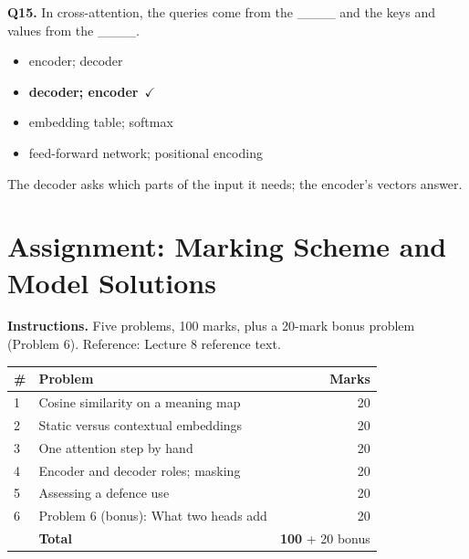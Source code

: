 \documentclass[11pt]{article}
\begin{document}
{\noindent\textbf{Q15.} In cross-attention, the queries come from the \_\_\_\_ and the keys and values from the \_\_\_\_.\begin{itemize}[leftmargin=2.2em,itemsep=0pt,topsep=1pt]\item[A.] encoder; decoder\item[\textbf{B.}] \textbf{decoder; encoder}~{\color{GrnN}$\checkmark$}\item[C.] embedding table; softmax\item[D.] feed-forward network; positional encoding\end{itemize} The decoder asks which parts of the input it needs; the encoder's vectors answer.\par\medskip

}

\section{Assignment: Marking Scheme and Model Solutions}

\textbf{Instructions.} Five problems, 100 marks, plus a 20-mark bonus problem (Problem 6). Reference: Lecture 8 reference text.

\begin{center}\small\renewcommand{\arraystretch}{1.25}\begin{tabularx}{0.85\textwidth}{@{}l X r@{}}\toprule\textbf{\#} & \textbf{Problem} & \textbf{Marks}\\\midrule1 & Cosine similarity on a meaning map & 20\\
2 & Static versus contextual embeddings & 20\\
3 & One attention step by hand & 20\\
4 & Encoder and decoder roles; masking & 20\\
5 & Assessing a defence use & 20\\
6 & Problem 6 (bonus): What two heads add & 20\\\midrule & \textbf{Total} & \textbf{100} + 20 bonus\\\bottomrule\end{tabularx}\end{center}
\end{document}
